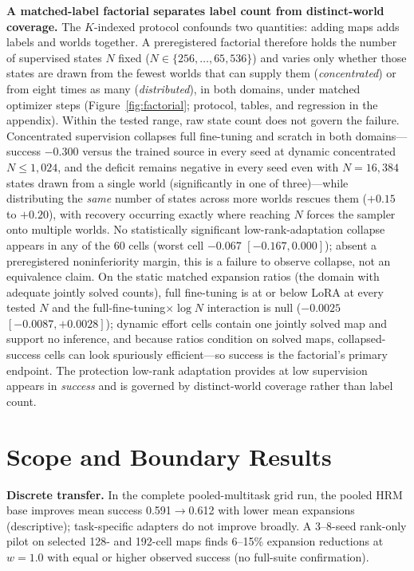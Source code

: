 \documentclass[letterpaper]{article} %
\begin{document}
\textbf{A matched-label factorial separates label count from distinct-world coverage.} The $K$-indexed protocol confounds two quantities: adding maps adds labels and worlds together. A preregistered factorial therefore holds the number of supervised states $N$ fixed ($N \in \{256, \ldots, 65{,}536\}$) and varies only whether those states are drawn from the fewest worlds that can supply them (\emph{concentrated}) or from eight times as many (\emph{distributed}), in both domains, under matched optimizer steps (Figure~\ref{fig:factorial}; protocol, tables, and regression in the appendix). Within the tested range, raw state count does not govern the failure. Concentrated supervision collapses full fine-tuning and scratch in both domains---success $-0.300$ versus the trained source in every seed at dynamic concentrated $N \leq 1{,}024$, and the deficit remains negative in every seed even with $N{=}16{,}384$ states drawn from a single world (significantly in one of three)---while distributing the \emph{same} number of states across more worlds rescues them ($+0.15$ to $+0.20$), with recovery occurring exactly where reaching $N$ forces the sampler onto multiple worlds. No statistically significant low-rank-adaptation collapse appears in any of the 60 cells (worst cell $-0.067$ $[-0.167, 0.000]$); absent a preregistered noninferiority margin, this is a failure to observe collapse, not an equivalence claim. On the static matched expansion ratios (the domain with adequate jointly solved counts), full fine-tuning is at or below LoRA at every tested $N$ and the full-fine-tuning$\times\log N$ interaction is null ($-0.0025$ $[-0.0087, +0.0028]$); dynamic effort cells contain one jointly solved map and support no inference, and because ratios condition on solved maps, collapsed-success cells can look spuriously efficient---so success is the factorial's primary endpoint. The protection low-rank adaptation provides at low supervision appears in \emph{success} and is governed by distinct-world coverage rather than label count.

\section{Scope and Boundary Results}

\textbf{Discrete transfer.} In the complete pooled-multitask grid run, the pooled HRM base improves mean success 0.591$\to$0.612 with lower mean expansions (descriptive); task-specific adapters do not improve broadly. A 3--8-seed rank-only pilot on selected 128- and 192-cell maps finds 6--15\% expansion reductions at $w{=}1.0$ with equal or higher observed success (no full-suite confirmation).
\end{document}
